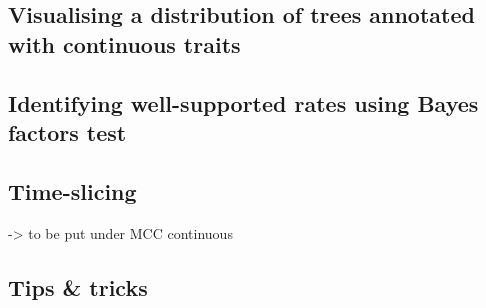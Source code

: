 \documentclass[english]{paper}
\begin{document}
\subsection{Visualising a distribution of trees annotated with continuous traits}


\subsection{Identifying well-supported rates using Bayes factors test}

% 
%
\subsection{Time-slicing}
-> to be put under MCC continuous 

% 
% 

\subsection{Tips \& tricks}
\label{tips}
% 




 
\end{document}
